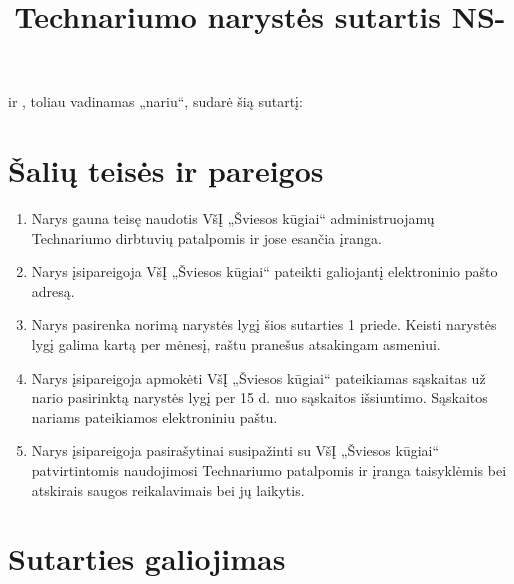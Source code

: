 \documentclass[
  paper=a4,
  fontsize=10pt,
  parskip=full,
  DIV=21,
  BCOR=8mm,
   footinclude=true,
  headheight=2pt,
  footheight=1pt,
  footsepline=true
]{scrartcl}
\title{Technariumo narystės sutartis NS-\getproperty{agreement}{number}}
\begin{document}
\pagestyle{scrheadings}






\maketitle



\textbf{} ir 
\textbf{}, toliau vadinamas „nariu“, sudarė šią sutartį:
\section{Šalių teisės ir pareigos}

\begin{enumerate}
\item Narys gauna teisę naudotis VšĮ „Šviesos kūgiai“ administruojamų Technariumo dirbtuvių patalpomis ir jose esančia įranga.
\item Narys įsipareigoja VšĮ „Šviesos kūgiai“ pateikti galiojantį elektroninio pašto adresą.
\item Narys pasirenka norimą narystės lygį šios sutarties 1 priede. Keisti narystės lygį galima kartą per mėnesį, raštu pranešus atsakingam asmeniui.   
\item Narys įsipareigoja apmokėti VšĮ „Šviesos kūgiai“ pateikiamas sąskaitas už nario pasirinktą narystės lygį per 15 d. nuo sąskaitos išsiuntimo. Sąskaitos nariams pateikiamos elektroniniu paštu.
\item Narys įsipareigoja pasirašytinai susipažinti su VšĮ „Šviesos kūgiai“ patvirtintomis naudojimosi Technariumo patalpomis ir įranga taisyklėmis bei atskirais saugos reikalavimais bei jų laikytis. 
\end{enumerate}

\section{Sutarties galiojimas}
\end{document}
